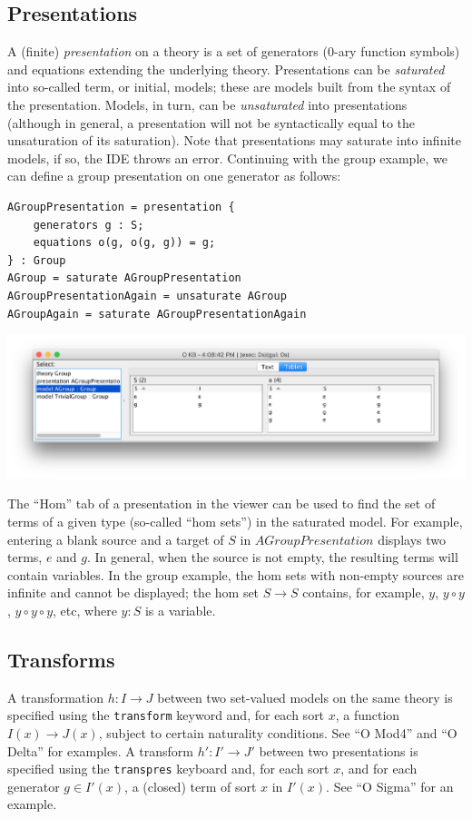 \documentclass[12pt]{article}
\begin{document}
\subsection{Presentations}
A (finite) {\it presentation} on a theory is a set of generators (0-ary function symbols) and equations extending the underlying theory.  Presentations can be {\it saturated} into so-called term, or initial, models; these are models built from the syntax of the presentation.  Models, in turn, can be {\it unsaturated} into presentations (although in general, a presentation will not be syntactically equal to the unsaturation of its saturation).  Note that presentations may saturate into infinite models, if so, the IDE throws an error.  Continuing with the group example, we can define a group presentation on one generator as follows:
\begin{verbatim}
AGroupPresentation = presentation {
	generators g : S;
	equations o(g, o(g, g)) = g;
} : Group
AGroup = saturate AGroupPresentation
AGroupPresentationAgain = unsaturate AGroup
AGroupAgain = saturate AGroupPresentationAgain
\end{verbatim}
\begin{center}
\includegraphics[width=6in]{group3}
\end{center}
The ``Hom'' tab of a presentation in the viewer can be used to find the set of terms of a given type (so-called ``hom sets'') in the saturated model.  For example, entering a blank source and a target of $S$ in $AGroupPresentation$ displays two terms, $e$ and $g$.  In general, when the source is not empty, the resulting terms will contain variables.  In the group example, the hom sets with non-empty sources are infinite and cannot be displayed; the hom set $S \to S$ contains, for example, $y$, $y \circ y$, $y \circ y \circ y$, etc, where $y : S$ is a variable.  

\subsection{Transforms}
A transformation $h : I \to J$ between two set-valued models on the same theory is specified using the {\tt transform} keyword and, for each sort $x$, a function $I(x) \to J(x)$, subject to certain naturality conditions.  See ``O Mod4'' and ``O Delta'' for examples.  A transform $h' : I' \to J'$ between two presentations is specified using the {\tt transpres} keyboard and, for each sort $x$, and for each generator $g \in I'(x)$, a (closed) term of sort $x$ in $I'(x)$.  See ``O Sigma'' for an example.
 
\end{document}
